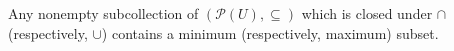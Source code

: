 Any nonempty subcollection of $(\mathcal{P}(U), \subseteq)$ which is closed under $\cap$ (respectively, $\cup$) contains a minimum (respectively, maximum) subset.
